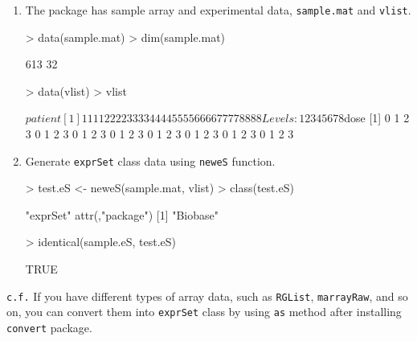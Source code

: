 \documentclass[11pt]{article}
\begin{document}
\begin{enumerate}

\item The package has sample array and experimental data, {\tt sample.mat} and {\tt vlist}.
\begin{Schunk}
\begin{Sinput}
> data(sample.mat)
> dim(sample.mat)
\end{Sinput}
\begin{Soutput}
[1] 613  32
\end{Soutput}
\begin{Sinput}
> data(vlist)
> vlist
\end{Sinput}
\begin{Soutput}
$patient
 [1] 1 1 1 1 2 2 2 2 3 3 3 3 4 4 4 4 5 5 5 5 6 6 6 6 7 7 7 7 8 8 8 8
Levels: 1 2 3 4 5 6 7 8

$dose
 [1] 0 1 2 3 0 1 2 3 0 1 2 3 0 1 2 3 0 1 2 3 0 1 2 3 0 1 2 3 0 1 2 3
\end{Soutput}
\end{Schunk}

\item Generate {\tt exprSet} class data using {\tt neweS} function.
\begin{Schunk}
\begin{Sinput}
> test.eS <- neweS(sample.mat, vlist)
> class(test.eS)
\end{Sinput}
\begin{Soutput}
[1] "exprSet"
attr(,"package")
[1] "Biobase"
\end{Soutput}
\begin{Sinput}
> identical(sample.eS, test.eS)
\end{Sinput}
\begin{Soutput}
[1] TRUE
\end{Soutput}
\end{Schunk}


\end{enumerate}


{\tt c.f.} If you have different types of array data, such as {\tt RGList}, {\tt marrayRaw}, and so on, 
you can convert them into {\tt exprSet} class by using {\tt as} method after installing {\tt convert} package.
\end{document}
